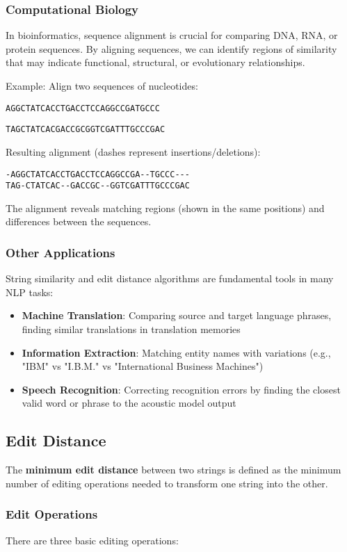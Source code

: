 \documentclass[11pt,a4paper]{article}
\theoremstyle{definition}
\theoremstyle{plain}
\theoremstyle{remark}
\begin{document}
\subsubsection{Computational Biology}
In bioinformatics, sequence alignment is crucial for comparing DNA, RNA, or protein sequences. By aligning sequences, we can identify regions of similarity that may indicate functional, structural, or evolutionary relationships.

Example: Align two sequences of nucleotides:

\texttt{AGGCTATCACCTGACCTCCAGGCCGATGCCC}

\texttt{TAGCTATCACGACCGCGGTCGATTTGCCCGAC}

Resulting alignment (dashes represent insertions/deletions):
\begin{verbatim}
-AGGCTATCACCTGACCTCCAGGCCGA--TGCCC---
TAG-CTATCAC--GACCGC--GGTCGATTTGCCCGAC
\end{verbatim}

The alignment reveals matching regions (shown in the same positions) and differences between the sequences.

\subsubsection{Other Applications}
String similarity and edit distance algorithms are fundamental tools in many NLP tasks:
\begin{itemize}
    \item \textbf{Machine Translation}: Comparing source and target language phrases, finding similar translations in translation memories
    \item \textbf{Information Extraction}: Matching entity names with variations (e.g., "IBM" vs "I.B.M." vs "International Business Machines")
    \item \textbf{Speech Recognition}: Correcting recognition errors by finding the closest valid word or phrase to the acoustic model output
\end{itemize}

\subsection{Edit Distance}

The \textbf{minimum edit distance} between two strings is defined as the minimum number of editing operations needed to transform one string into the other.

\subsubsection{Edit Operations}
There are three basic editing operations:
\end{document}
